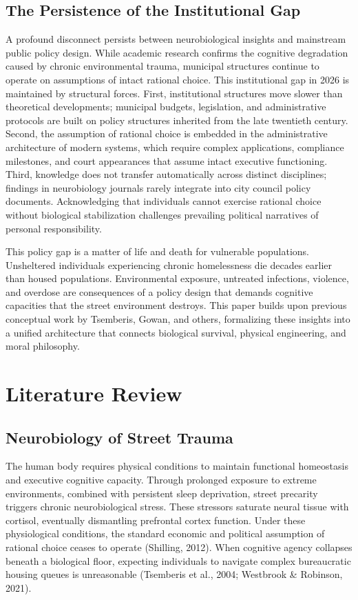 \documentclass[12pt]{article}
\begin{document}
\subsection{The Persistence of the Institutional Gap}
A profound disconnect persists between neurobiological insights and mainstream public policy design. While academic research confirms the cognitive degradation caused by chronic environmental trauma, municipal structures continue to operate on assumptions of intact rational choice. This institutional gap in 2026 is maintained by structural forces. First, institutional structures move slower than theoretical developments; municipal budgets, legislation, and administrative protocols are built on policy structures inherited from the late twentieth century. Second, the assumption of rational choice is embedded in the administrative architecture of modern systems, which require complex applications, compliance milestones, and court appearances that assume intact executive functioning. Third, knowledge does not transfer automatically across distinct disciplines; findings in neurobiology journals rarely integrate into city council policy documents. Acknowledging that individuals cannot exercise rational choice without biological stabilization challenges prevailing political narratives of personal responsibility.

This policy gap is a matter of life and death for vulnerable populations. Unsheltered individuals experiencing chronic homelessness die decades earlier than housed populations. Environmental exposure, untreated infections, violence, and overdose are consequences of a policy design that demands cognitive capacities that the street environment destroys. This paper builds upon previous conceptual work by Tsemberis, Gowan, and others, formalizing these insights into a unified architecture that connects biological survival, physical engineering, and moral philosophy.

\section{Literature Review}

\subsection{Neurobiology of Street Trauma}
The human body requires physical conditions to maintain functional homeostasis and executive cognitive capacity. Through prolonged exposure to extreme environments, combined with persistent sleep deprivation, street precarity triggers chronic neurobiological stress. These stressors saturate neural tissue with cortisol, eventually dismantling prefrontal cortex function. Under these physiological conditions, the standard economic and political assumption of rational choice ceases to operate (Shilling, 2012). When cognitive agency collapses beneath a biological floor, expecting individuals to navigate complex bureaucratic housing queues is unreasonable (Tsemberis et al., 2004; Westbrook \& Robinson, 2021).
\end{document}
